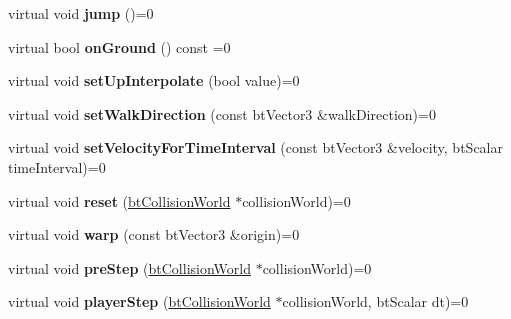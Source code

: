 \begin{DoxyCompactItemize}
virtual void {\bfseries jump} ()=0
\item 
\mbox{\label{classbtCharacterControllerInterface_a943e28cae25e3731a5e0145173ecc8a2}} 
virtual bool {\bfseries on\+Ground} () const =0
\item 
\mbox{\label{classbtCharacterControllerInterface_a6670c16b38f52a80c03f4a3ebb476699}} 
virtual void {\bfseries set\+Up\+Interpolate} (bool value)=0
\item 
\mbox{\label{classbtCharacterControllerInterface_a2374fcc9c98fe90709ad9e5afb60d396}} 
virtual void {\bfseries set\+Walk\+Direction} (const bt\+Vector3 \&walk\+Direction)=0
\item 
\mbox{\label{classbtCharacterControllerInterface_af54d6770114db0a54d4875bcc62bdf0b}} 
virtual void {\bfseries set\+Velocity\+For\+Time\+Interval} (const bt\+Vector3 \&velocity, bt\+Scalar time\+Interval)=0
\item 
\mbox{\label{classbtCharacterControllerInterface_a64b6d281a9c13e523632c808437fc4b2}} 
virtual void {\bfseries reset} (\hyperlink{classbtCollisionWorld}{bt\+Collision\+World} $\ast$collision\+World)=0
\item 
\mbox{\label{classbtCharacterControllerInterface_ad62636f9204768ed9c3c9884605b4f52}} 
virtual void {\bfseries warp} (const bt\+Vector3 \&origin)=0
\item 
\mbox{\label{classbtCharacterControllerInterface_add0f49483f16c91d5ff4426515a0ad9a}} 
virtual void {\bfseries pre\+Step} (\hyperlink{classbtCollisionWorld}{bt\+Collision\+World} $\ast$collision\+World)=0
\item 
\mbox{\label{classbtCharacterControllerInterface_a36747974481cc6395c7dcab9b1f10330}} 
virtual void {\bfseries player\+Step} (\hyperlink{classbtCollisionWorld}{bt\+Collision\+World} $\ast$collision\+World, bt\+Scalar dt)=0
\item 
\mbox{\label{classbtCharacterControllerInterface_a40dbb6ac95ab3ff167f90274a1315d32}} 

\end{DoxyCompactItemize}
